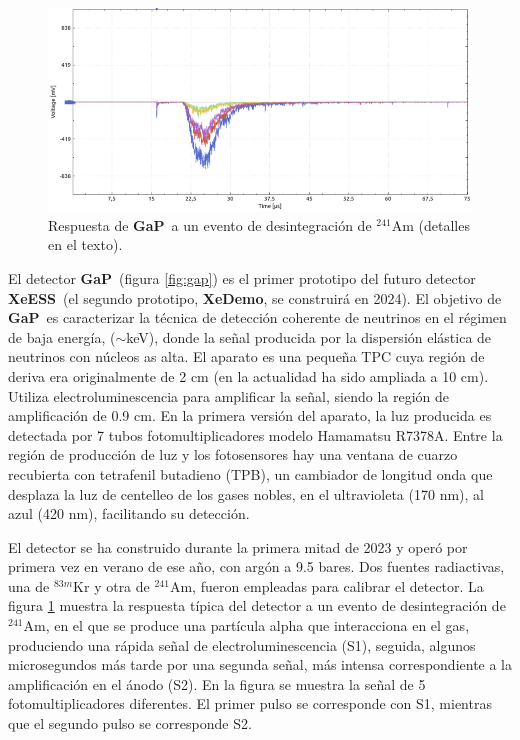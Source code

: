 \documentclass[12pt,a4paper,article]{report} %
\def\xess{{\bf XeESS}}
\def\xed{{\bf XeDemo}}
\def\gap{{\bf GaP}}
\begin{document}
\begin{figure}[bht!]
\begin{center}
\includegraphics[width=12cm]{img/wvfm.png}
\caption{Respuesta de \gap\ a un evento de desintegración de ${}^{241}$Am (detalles en el texto).}
\label{fig:wvf}
\end{center}
\end{figure}

El detector \gap\ (figura \ref{fig:gap}) es el primer prototipo del futuro detector \xess\ (el segundo prototipo, \xed, se construirá en 2024). El objetivo de \gap\ es  caracterizar la técnica de detección coherente de neutrinos en el régimen de baja energía, ($\sim$keV), donde la señal producida por la dispersión elástica de neutrinos con núcleos as alta. El aparato es una pequeña TPC cuya región de deriva era originalmente de 2 cm (en la actualidad ha sido ampliada a 10 cm). Utiliza electroluminescencia para amplificar la señal, siendo la región de amplificación de 0.9 cm. En la primera versión del aparato, la luz producida es detectada por 7 tubos fotomultiplicadores modelo Hamamatsu R7378A. Entre la región de producción de luz y los fotosensores hay una ventana de cuarzo recubierta con tetrafenil butadieno (TPB), un cambiador de longitud onda que desplaza la luz de centelleo de los gases nobles, en el ultravioleta (170 nm), al azul (420 nm), facilitando su detección.

El detector se ha construido durante la primera mitad de 2023 y operó por primera vez en verano de ese año, con argón a 9.5 bares. Dos fuentes radiactivas, una de ${}^{83m}$Kr y otra de ${}^{241}$Am, fueron empleadas para calibrar el detector. La figura \ref{fig:wvf} muestra la respuesta típica del detector a un evento de desintegración de ${}^{241}$Am, en el que se produce una partícula alpha que interacciona en el gas, produciendo una rápida señal de electroluminescencia (S1), seguida, algunos microsegundos más tarde por una segunda señal, más intensa correspondiente a la amplificación en el ánodo (S2). En la figura se muestra la señal de 5 fotomultiplicadores diferentes. El primer pulso se corresponde con S1, mientras que el segundo pulso se corresponde S2.
\end{document}

